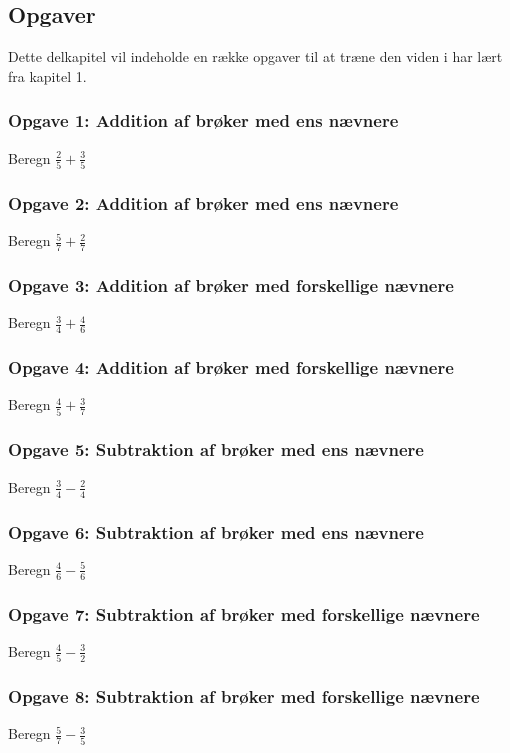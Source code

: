 \subsection{Opgaver}

Dette delkapitel vil indeholde en række opgaver til at træne den viden i har lært fra kapitel 1.

\subsubsection*{Opgave 1: Addition af brøker med ens nævnere}
Beregn $\frac{2}{5} + \frac{3}{5}$

\subsubsection*{Opgave 2: Addition af brøker med ens nævnere}
Beregn $\frac{5}{7} + \frac{2}{7}$

\subsubsection*{Opgave 3: Addition af brøker med forskellige nævnere}
Beregn $\frac{3}{4} + \frac{4}{6}$

\subsubsection*{Opgave 4: Addition af brøker med forskellige nævnere}
Beregn $\frac{4}{5} + \frac{3}{7}$

\subsubsection*{Opgave 5: Subtraktion af brøker med ens nævnere}
Beregn $\frac{3}{4} - \frac{2}{4}$

\subsubsection*{Opgave 6: Subtraktion af brøker med ens nævnere}
Beregn $\frac{4}{6} - \frac{5}{6}$

\subsubsection*{Opgave 7: Subtraktion af brøker med forskellige nævnere}
Beregn $\frac{4}{5} - \frac{3}{2}$

\subsubsection*{Opgave 8: Subtraktion af brøker med forskellige nævnere}
Beregn $\frac{5}{7} - \frac{3}{5}$

